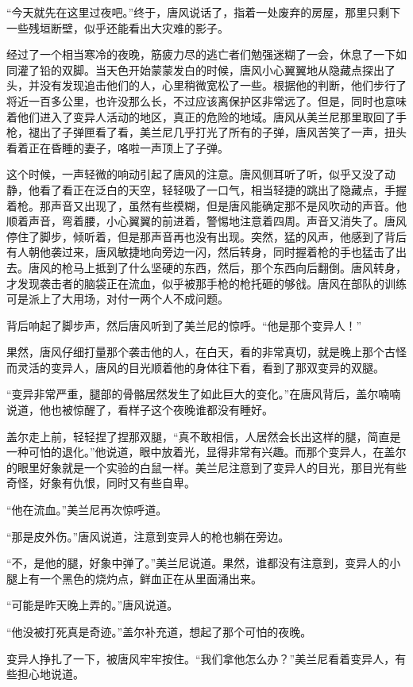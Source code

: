 “今天就先在这里过夜吧。”终于，唐风说话了，指着一处废弃的房屋，那里只剩下一些残垣断壁，似乎还能看出大灾难的影子。

经过了一个相当寒冷的夜晚，筋疲力尽的逃亡者们勉强迷糊了一会，休息了一下如同灌了铅的双脚。当天色开始蒙蒙发白的时候，唐风小心翼翼地从隐藏点探出了头，并没有发现追击他们的人，心里稍微宽松了一些。根据他的判断，他们步行了将近一百多公里，也许没那么长，不过应该离保护区非常远了。但是，同时也意味着他们进入了变异人活动的地区，真正的危险的地域。唐风从美兰尼那里取回了手枪，褪出了子弹匣看了看，美兰尼几乎打光了所有的子弹，唐风苦笑了一声，扭头看着正在昏睡的妻子，咯啦一声顶上了子弹。

这个时候，一声轻微的响动引起了唐风的注意。唐风侧耳听了听，似乎又没了动静，他看了看正在泛白的天空，轻轻吸了一口气，相当轻捷的跳出了隐藏点，手握着枪。那声音又出现了，虽然有些模糊，但是唐风能确定那不是风吹动的声音。他顺着声音，弯着腰，小心翼翼的前进着，警惕地注意着四周。声音又消失了。唐风停住了脚步，倾听着，但是那声音再也没有出现。突然，猛的风声，他感到了背后有人朝他袭过来，唐风敏捷地向旁边一闪，然后转身，同时握着枪的手也猛击了出去。唐风的枪马上抵到了什么坚硬的东西，然后，那个东西向后翻倒。唐风转身，才发现袭击者的脑袋正在流血，似乎被那手枪的枪托砸的够戗。唐风在部队的训练可是派上了大用场，对付一两个人不成问题。

背后响起了脚步声，然后唐风听到了美兰尼的惊呼。“他是那个变异人！”

果然，唐风仔细打量那个袭击他的人，在白天，看的非常真切，就是晚上那个古怪而灵活的变异人，唐风的目光顺着他的身体往下看，看到了那双变异的双腿。

“变异非常严重，腿部的骨骼居然发生了如此巨大的变化。”在唐风背后，盖尔喃喃说道，他也被惊醒了，看样子这个夜晚谁都没有睡好。

盖尔走上前，轻轻捏了捏那双腿，“真不敢相信，人居然会长出这样的腿，简直是一种可怕的退化。”他说道，眼中放着光，显得非常有兴趣。而那个变异人，在盖尔的眼里好象就是一个实验的白鼠一样。美兰尼注意到了变异人的目光，那目光有些奇怪，好象有仇恨，同时又有些自卑。

“他在流血。”美兰尼再次惊呼道。

“那是皮外伤。”唐风说道，注意到变异人的枪也躺在旁边。

“不，是他的腿，好象中弹了。”美兰尼说道。果然，谁都没有注意到，变异人的小腿上有一个黑色的烧灼点，鲜血正在从里面涌出来。

“可能是昨天晚上弄的。”唐风说道。

“他没被打死真是奇迹。”盖尔补充道，想起了那个可怕的夜晚。

变异人挣扎了一下，被唐风牢牢按住。“我们拿他怎么办？”美兰尼看着变异人，有些担心地说道。

